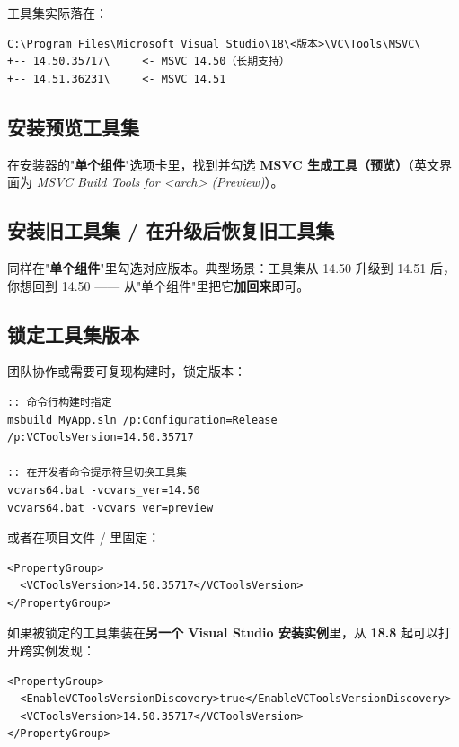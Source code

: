 工具集实际落在：

\begin{lstlisting}[style=textstyle]
C:\Program Files\Microsoft Visual Studio\18\<版本>\VC\Tools\MSVC\
+-- 14.50.35717\     <- MSVC 14.50（长期支持）
+-- 14.51.36231\     <- MSVC 14.51
\end{lstlisting}

\subsection{安装预览工具集}
在安装器的"\textbf{单个组件}"选项卡里，找到并勾选 \textbf{MSVC 生成工具（预览）}（英文界面为 \emph{MSVC Build Tools for <arch> (Preview)}）。

\subsection{安装旧工具集 / 在升级后恢复旧工具集}
同样在"\textbf{单个组件}"里勾选对应版本。典型场景：工具集从 14.50 升级到 14.51 后，你想回到 14.50 —— 从"单个组件"里把它\textbf{加回来}即可。

\subsection{锁定工具集版本}
团队协作或需要可复现构建时，锁定版本：

\begin{lstlisting}[style=shellstyle]
:: 命令行构建时指定
msbuild MyApp.sln /p:Configuration=Release /p:VCToolsVersion=14.50.35717

:: 在开发者命令提示符里切换工具集
vcvars64.bat -vcvars_ver=14.50
vcvars64.bat -vcvars_ver=preview
\end{lstlisting}

或者在项目文件 /  里固定：

\begin{lstlisting}[style=xmlstyle]
<PropertyGroup>
  <VCToolsVersion>14.50.35717</VCToolsVersion>
</PropertyGroup>
\end{lstlisting}

如果被锁定的工具集装在\textbf{另一个 Visual Studio 安装实例}里，从 \textbf{18.8} 起可以打开跨实例发现：

\begin{lstlisting}[style=xmlstyle]
<PropertyGroup>
  <EnableVCToolsVersionDiscovery>true</EnableVCToolsVersionDiscovery>
  <VCToolsVersion>14.50.35717</VCToolsVersion>
</PropertyGroup>
\end{lstlisting}

